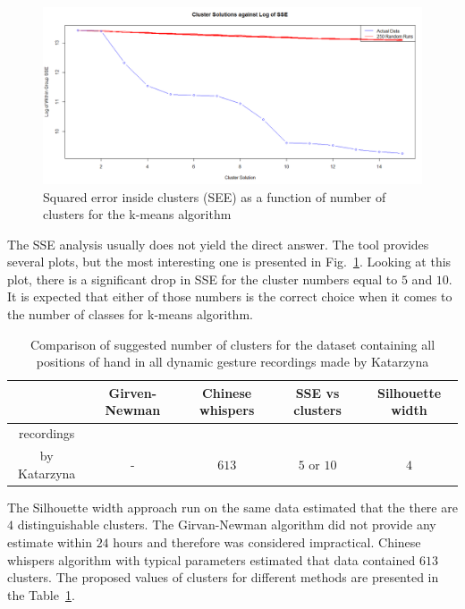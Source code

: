 \begin{figure}[htbp!]
\centering
 \includegraphics[width=1.0\columnwidth]{figures/SSE1.png}
 \caption{Squared error inside clusters (SEE) as a function of number of clusters for the k-means algorithm}
 \label{dynamicSSE}
\end{figure}

The SSE analysis usually does not yield the direct answer.
The tool provides several plots, but the most interesting one is presented in Fig.~\ref{dynamicSSE}. 
Looking at this plot, there is a significant drop in SSE for the cluster numbers equal to $5$ and $10$.
It is expected that either of those numbers is the correct choice when it comes to the number of classes for k-means algorithm.

\begin{table}[htbp!]
 \caption{Comparison of suggested number of clusters for the dataset containing all positions of hand in all dynamic gesture recordings made by Katarzyna}
 \label{clusterwyn}
    \begin{tabular}{ccccc}
    \hline
     & Girven-Newman & Chinese whispers   & SSE vs clusters & Silhouette width  \\ \hline
    recordings \\by Katarzyna          & -      & $613$ & $5$ or $10$     & $4$     \\ \hline
    \end{tabular}
\end{table}

The Silhouette width approach run on the same data estimated that the there are $4$ distinguishable clusters.
The Girvan-Newman algorithm did not provide any estimate within $24$ hours and therefore was considered impractical.
Chinese whispers algorithm with typical parameters estimated that data contained $613$ clusters.
The proposed values of clusters for different methods are presented in the Table~\ref{clusterwyn}.

